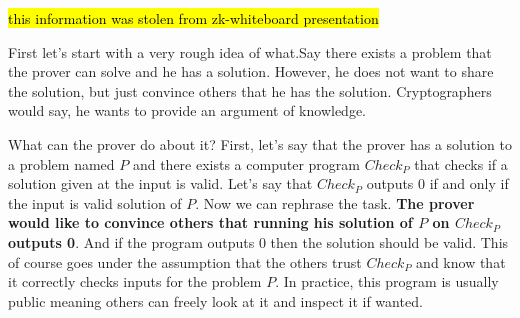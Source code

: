 \hl{this information was stolen from zk-whiteboard presentation}
\begin{table}[h]
    \centering
    \caption{Comparison of protocols}
\end{table}

First let's start with a very rough idea of what.Say there exists a problem that the prover can solve and he has a solution. However, he does not want to share the solution, but just convince others that he has the solution. Cryptographers would say, he wants to provide an argument of knowledge.

What can the prover do about it? First, let's say that the prover has a solution to a problem named $P$ and there exists a computer program $Check_P$ that checks if a solution given at the input is valid. Let's say that $Check_P$ outputs 0 if and only if the input is valid solution of $P$. Now we can rephrase the task. \textbf{The prover would like to convince others that running his solution of $P$ on $Check_P$ outputs 0}. And if the program outputs 0 then the solution should be valid. This of course goes under the assumption that the others trust $Check_P$ and know that it correctly checks inputs for the problem $P$. In practice, this program is usually public meaning others can freely look at it and inspect it if wanted. 

